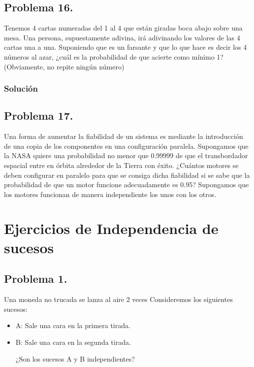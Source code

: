 \documentclass[
]{article}
\begin{document}
\hypertarget{problema-16.}{%
\subsection{Problema 16.}\label{problema-16.}}

Tenemos 4 cartas numeradas del 1 al 4 que están giradas boca abajo sobre
una mesa. Una persona, supuestamente adivina, irá adivinando los valores
de las 4 cartas una a una. Suponiendo que es un farsante y que lo que
hace es decir los 4 números al azar, ¿cuál es la probabilidad de que
acierte como mínimo 1? (Obviamente, no repite ningún número)

\hypertarget{soluciuxf3n-16}{%
\subsubsection{Solución}\label{soluciuxf3n-16}}

\hypertarget{problema-17.}{%
\subsection{Problema 17.}\label{problema-17.}}

Una forma de aumentar la fiabilidad de un sistema es mediante la
introducción de una copia de los componentes en una configuración
paralela. Supongamos que la NASA quiere una probabilidad no menor que
0.99999 de que el transbordador espacial entre en órbita alrededor de la
Tierra con éxito. ¿Cuántos motores se deben configurar en paralelo para
que se consiga dicha fiabilidad si se sabe que la probabilidad de que un
motor funcione adecuadamente es 0.95? Supongamos que los motores
funcionan de manera independiente los unos con los otros.

\hypertarget{ejercicios-de-independencia-de-sucesos}{%
\section{Ejercicios de Independencia de
sucesos}\label{ejercicios-de-independencia-de-sucesos}}

\hypertarget{problema-1.}{%
\subsection{Problema 1.}\label{problema-1.}}

Una moneda no trucada se lanza al aire 2 veces Consideremos los
siguientes sucesos:

\begin{itemize}
\item
  A: Sale una cara en la primera tirada.
\item
  B: Sale una cara en la segunda tirada.

  ¿Son los sucesos A y B independientes?
\end{itemize}
\end{document}
